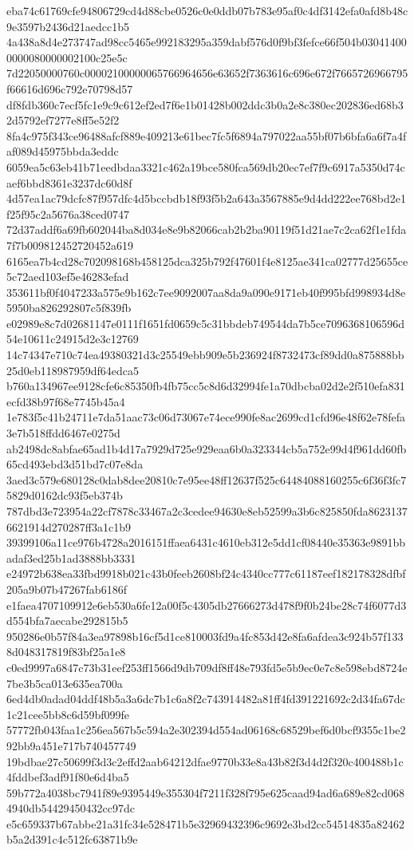{eba74c61769cfe94806729cd4d88cbe0526c0e0ddb07b783e95af0c4df3142efa0afd8b48c9e3597b2436d21aedcc1b5
4a438a8d4e273747ad98cc5465e992183295a359dabf576d0f9bf3fefce66f504b030414000000080000002100c25e5c
7d22050000760c00002100000065766964656e63652f7363616c696e672f7665726966795f66616d696c792e70798d57
df8fdb360c7ecf5fc1e9c9c612ef2ed7f6e1b01428b002ddc3b0a2e8c380ec202836ed68b32d5792ef7277e8ff5e52f2
8fa4c975f343ce96488afcf889e409213e61bec7fc5f6894a797022aa55bf07b6bfa6a6f7a4faf089d45975bbda3eddc
6059ea5c63eb41b71eedbdaa3321c462a19bce580fca569db20ec7ef7f9c6917a5350d74caef6bbd8361e3237dc60d8f
4d57ea1ac79dcfc87f957dfc4d5bccbdb18f93f5b2a643a3567885e9d4dd222ee768bd2e1f25f95c2a5676a38ced0747
72d37addf6a69fb602044ba8d034e8e9b82066cab2b2ba90119f51d21ae7c2ca62f1e1fda7f7b009812452720452a619
6165ea7b4cd28c702098168b458125dca325b792f47601f4e8125ae341ca02777d25655ce5c72aed103ef5e46283efad
353611bf0f4047233a575e9b162c7ee9092007aa8da9a090e9171eb40f995bfd998934d8e5950ba826292807c5f839fb
e02989e8c7d02681147e0111f1651fd0659c5c31bbdeb749544da7b5ce7096368106596d54e10611c24915d2e3c12769
14c74347e710c74ea49380321d3c25549ebb909e5b236924f8732473cf89dd0a875888bb25d0eb118987959df64edca5
b760a134967ee9128cfe6c85350fb4fb75cc5c8d6d32994fe1a70dbcba02d2e2f510efa831ecfd38b97f68e7745b45a4
1e783f5c41b24711e7da51aac73c06d73067e74ece990fe8ac2699cd1cfd96e48f62e78fefa3e7b518ffdd6467e0275d
ab2498dc8abfae65ad1b4d17a7929d725e929eaa6b0a323344cb5a752e99d4f961dd60fb65cd493ebd3d51bd7c07e8da
3aed3c579e680128c0dab8dee20810c7e95ee48ff12637f525c64484088160255c6f36f3fc75829d0162dc93f5eb374b
787dbd3e723954a22cf7878c33467a2c3cedee94630e8eb52599a3b6c825850fda86231376621914d270287ff3a1c1b9
39399106a11ce976b4728a2016151ffaea6431c4610eb312e5dd1cf08440e35363e9891bbadaf3ed25b1ad3888bb3331
e24972b638ea33fbd9918b021c43b0feeb2608bf24c4340cc777c61187eef182178328dfbf205a9b07b47267fab6186f
e1faea4707109912e6eb530a6fe12a00f5c4305db27666273d478f9f0b24be28c74f6077d3d554bfa7aecabe292815b5
950286e0b57f84a3ea97898b16cf5d1ce810003fd9a4fc853d42e8fa6afdea3c924b57f1338d048317819f83bf25a1e8
c0ed9997a6847c73b31eef253ff1566d9db709df8ff48e793fd5e5b9ec0e7c8e598ebd8724e7be3b5ca013e635ea700a
6ed4db0adad04ddf48b5a3a6dc7b1c6a8f2c743914482a81ff4fd391221692c2d34fa67dc1c21cee5bb8c6d59bf099fe
57772fb043faa1c256ea567b5c594a2e302394d554ad06168c68529bef6d0bcf9355c1be292bb9a451e717b740457749
19bdbae27c50699f3d3c2effd2aab64212dfae9770b33e8a43b82f3d4d2f320c400488b1c4fddbef3adf91f80e6d4ba5
59b772a4038bc7941f89e9395449e355304f7211f328f795e625caad94ad6a689e82cd0684940db54429450432cc97dc
e5c659337b67abbe21a31fc34e528471b5e32969432396c9692e3bd2cc54514835a82462b5a2d391c4c512fc63871b9e
}
